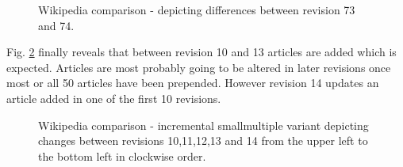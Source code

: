 \begin{figure}[tb]
\caption{\label{fig:wikipedia-rev7374} Wikipedia comparison - depicting differences between revision 73 and 74.}
\end{figure}

Fig. \ref{fig:wikipedia-smallmultiple-incremental} finally reveals that between revision 10 and 13 articles are added which is expected. Articles are most probably going to be altered in later revisions once most or all 50 articles have been pre\-pen\-ded. However revision 14 updates an article added in one of the first 10 revisions.

\begin{figure}[tb]
\caption{\label{fig:wikipedia-smallmultiple-incremental} Wikipedia comparison - incremental smallmultiple variant depicting changes between revisions 10,11,12,13 and 14 from the upper left to the bottom left in clockwise order.}
\end{figure}


